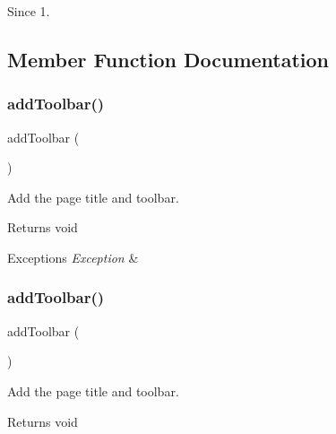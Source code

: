\begin{DoxySince}{Since}
1. 
\end{DoxySince}


\subsection{Member Function Documentation}
\mbox{\label{classtks__agenda_view_download_af327e89538be614e923c7e5863319f43}} 
\subsubsection{add\+Toolbar()\hspace{0.1cm}{\footnotesize\ttfamily [1/2]}}
{\footnotesize\ttfamily add\+Toolbar (\begin{DoxyParamCaption}{ }\end{DoxyParamCaption})\hspace{0.3cm}{\ttfamily [protected]}}

Add the page title and toolbar.

\begin{DoxyReturn}{Returns}
void
\end{DoxyReturn}

\begin{DoxyExceptions}{Exceptions}
{\em Exception} & \\
\hline
\end{DoxyExceptions}
\mbox{\label{classtks__agenda_view_download_af327e89538be614e923c7e5863319f43}} 
\subsubsection{add\+Toolbar()\hspace{0.1cm}{\footnotesize\ttfamily [2/2]}}
{\footnotesize\ttfamily add\+Toolbar (\begin{DoxyParamCaption}{ }\end{DoxyParamCaption})\hspace{0.3cm}{\ttfamily [protected]}}

Add the page title and toolbar.

\begin{DoxyReturn}{Returns}
void
\end{DoxyReturn}

